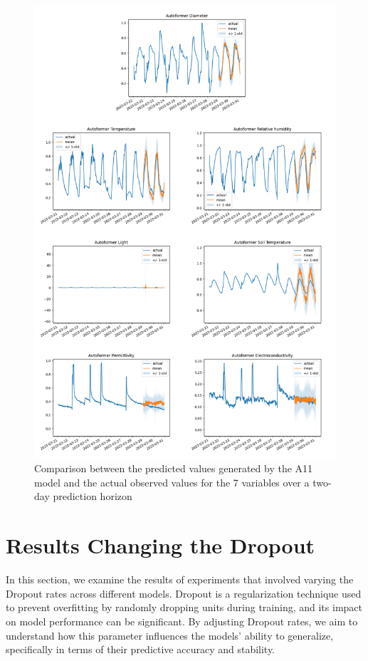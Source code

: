 \begin{figure}[htbp]
    \centering
    \includegraphics[width=15 cm]{6_ChapterResults/figuras/A11.png}
    \caption{Comparison between the predicted values generated by the A11 model and the actual observed values for the 7 variables over a two-day prediction horizon}
    \label{A11}
\end{figure}

\section{Results Changing the Dropout}
In this section, we examine the results of experiments that involved varying the Dropout rates across different models. Dropout is a regularization technique used to prevent overfitting by randomly dropping units during training, and its impact on model performance can be significant. By adjusting Dropout rates, we aim to understand how this parameter influences the models' ability to generalize, specifically in terms of their predictive accuracy and stability.

